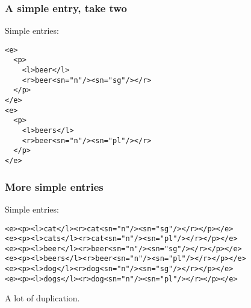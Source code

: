 \documentclass{beamer} %
\begin{document}
\begin{frame}
  \frametitle{A simple entry, take two}

  \begin{exampleblock}{Simple entries:}
    \begin{footnotesize}
    \begin{alltt}
      <e> \\
      ~~<p> \\
      ~~~~<l>beer</l> \\
      ~~~~<r>beer<s n="n"/><s n="sg"/></r> \\
      ~~</p> \\
      </e> \\
      <e> \\
      ~~<p> \\
      ~~~~<l>beers</l> \\
      ~~~~<r>beer<s n="n"/><s n="pl"/></r> \\
      ~~</p> \\
      </e>
    \end{alltt}
    \end{footnotesize}
\end{exampleblock}

\end{frame}

\begin{frame}
  \frametitle{More simple entries}

  \begin{exampleblock}{Simple entries:}
    \begin{footnotesize}
    \begin{alltt}
      <e><p><l>cat</l><r>cat<s n="n"/><s n="sg"/></r></p></e> \\
      <e><p><l>cats</l><r>cat<s n="n"/><s n="pl"/></r></p></e> \\
      <e><p><l>beer</l><r>beer<s n="n"/><s n="sg"/></r></p></e> \\
      <e><p><l>beers</l><r>beer<s n="n"/><s n="pl"/></r></p></e> \\
      <e><p><l>dog</l><r>dog<s n="n"/><s n="sg"/></r></p></e> \\
      <e><p><l>dogs</l><r>dog<s n="n"/><s n="pl"/></r></p></e>
    \end{alltt}
    \end{footnotesize}
\end{exampleblock}

A lot of duplication.
\end{frame}
\end{document}
